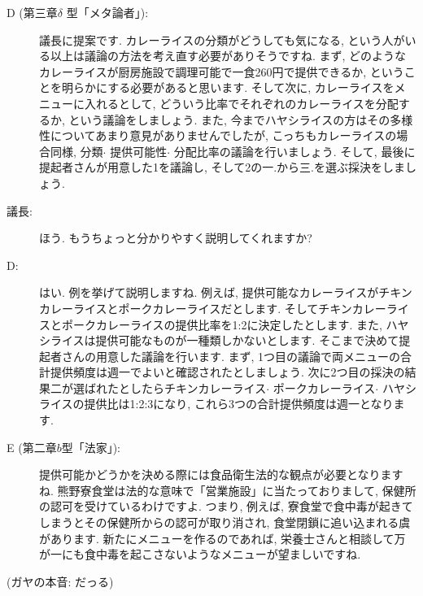 \documentclass[10pt,b5jsbook,dvips,dvipdfmx,openany]{jsbook}
\theoremstyle{definition}
\begin{document}
		\begin{description}

		\item[D (第三章$ \delta $ 型「メタ論者」): ]議長に提案です. カレーライスの分類がどうしても気になる, という人がいる以上は議論の方法を考え直す必要がありそうですね. まず, どのようなカレーライスが厨房施設で調理可能で一食260円で提供できるか, ということを明らかにする必要があると思います. そして次に, カレーライスをメニューに入れるとして, どういう比率でそれぞれのカレーライスを分配するか, という議論をしましょう. また, 今までハヤシライスの方はその多様性についてあまり意見がありませんでしたが, こっちもカレーライスの場合同様, 分類$ \cdot $ 提供可能性$ \cdot $ 分配比率の議論を行いましょう. そして, 最後に提起者さんが用意した1を議論し, そして2の一.から三.を選ぶ採決をしましょう.

		\item[議長: ]ほう. もうちょっと分かりやすく説明してくれますか?

		\item[D: ]はい. 例を挙げて説明しますね. 例えば, 提供可能なカレーライスがチキンカレーライスとポークカレーライスだとします. そしてチキンカレーライスとポークカレーライスの提供比率を1:2に決定したとします. また, ハヤシライスは提供可能なものが一種類しかないとします. そこまで決めて提起者さんの用意した議論を行います. まず, 1つ目の議論で両メニューの合計提供頻度は週一でよいと確認されたとしましょう. 次に2つ目の採決の結果二が選ばれたとしたらチキンカレーライス$ \cdot $ ポークカレーライス$ \cdot $ ハヤシライスの提供比は1:2:3になり, これら3つの合計提供頻度は週一となります.

		\item[E (第二章$b$型「法家」): ]提供可能かどうかを決める際には食品衛生法的な観点が必要となりますね. 熊野寮食堂は法的な意味で「営業施設」に当たっておりまして, 保健所の認可を受けているわけですよ. つまり, 例えば, 寮食堂で食中毒が起きてしまうとその保健所からの認可が取り消され, 食堂閉鎖に追い込まれる虞があります. 新たにメニューを作るのであれば, 栄養士さんと相談して万が一にも食中毒を起こさないようなメニューが望ましいですね.

		\end{description}

		(ガヤの本音: だっる)
\end{document}
